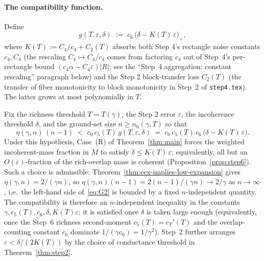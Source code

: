 \paragraph{The compatibility function.}
Define
\[
  g(T,\varepsilon,\delta)
  \;:=\; c_6 \, \big(\delta - K(T)\,\varepsilon\big)_+,
\]
where $K(T) := C_4/c_4 + C_2(T)$ absorbs both Step 4's rectangle
noise constants $c_4, C_4$ (the rescaling $C_4\mapsto C_4/c_4$ comes
from factoring $c_4$ out of Step~4's per-rectangle bound
$(c_4\alpha - C_4\varepsilon)|R|$; see the ``Step~4 aggregation:
constant rescaling'' paragraph below) and the Step 2 block-transfer
loss $C_2(T)$ (the transfer of fiber monotonicity to block
monotonicity in Step~2 of \texttt{step4.tex}). The latter grows at
most polynomially in $T$.

\begin{proposition}[G2 compatibility]\label{prop:G2}
Fix the richness threshold $T = T(\gamma)$, the Step 2 error
$\varepsilon$, the incoherence threshold $\delta$, and the ground-set
size $n \ge n_0(\gamma, T)$ so that
\begin{equation}\label{eq:G2}
  \eta(\gamma, n)\,(n-1)
  \;<\; c_0\,c_5(T)\,g(T,\varepsilon,\delta)
  \;=\; c_0\,c_5(T)\,c_6\,\big(\delta - K(T)\,\varepsilon\big).
\end{equation}
Under this hypothesis, Case~(R) of Theorem~\ref{thm:main} forces the
weighted incoherent-mass fraction in $M$ to satisfy
$\delta \le K(T)\,\varepsilon$; equivalently, all but an
$O(\varepsilon)$-fraction of the rich-overlap mass is coherent
(Proposition~\ref{prop:step6}). Such a choice is admissible:
Theorem~\ref{thm:cex-implies-low-expansion} gives $\eta(\gamma, n) =
2/(\gamma n)$, so $\eta(\gamma, n)(n-1) = 2(n-1)/(\gamma n) \to
2/\gamma$ as $n \to \infty$, i.e.\ the left-hand side
of~\eqref{eq:G2} is bounded by a fixed $n$-independent quantity.
The compatibility is therefore an $n$-independent inequality in
the constants $\gamma, c_5(T), c_6, \delta, K(T)\varepsilon$; it is
satisfied once $\delta$ is taken large enough (equivalently, once
the Step~6 richness second-moment $c_5(T) = c_T'(T)$ and the
overlap-counting constant $c_6$ dominate $1/(\gamma c_0) = 1/\gamma^2$).
Step~2 further arranges $\varepsilon < \delta/(2 K(T))$ by the
choice of conductance threshold in Theorem~\ref{thm:step2}.
\end{proposition}

